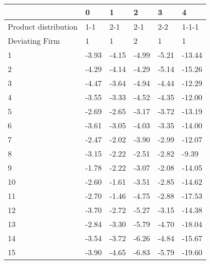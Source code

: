 \begin{tabular}{llllll}
\toprule
 & 0 & 1 & 2 & 3 & 4 \\
\midrule
Product distribution & 1-1 & 2-1  & 2-1  & 2-2  & 1-1-1 \\
Deviating Firm & 1 & 1 & 2 & 1 & 1 \\
1 & -3.93 & -4.15 & -4.99 & -5.21 & -13.44 \\
2 & -4.29 & -4.14 & -4.29 & -5.14 & -15.26 \\
3 & -4.47 & -3.64 & -4.94 & -4.44 & -12.29 \\
4 & -3.55 & -3.33 & -4.52 & -4.35 & -12.00 \\
5 & -2.69 & -2.65 & -3.17 & -3.72 & -13.19 \\
6 & -3.61 & -3.05 & -4.03 & -3.35 & -14.00 \\
7 & -2.47 & -2.02 & -3.90 & -2.99 & -12.07 \\
8 & -3.15 & -2.22 & -2.51 & -2.82 & -9.39 \\
9 & -1.78 & -2.22 & -3.07 & -2.08 & -14.05 \\
10 & -2.60 & -1.61 & -3.51 & -2.85 & -14.62 \\
11 & -2.70 & -1.46 & -4.75 & -2.88 & -17.53 \\
12 & -3.70 & -2.72 & -5.27 & -3.15 & -14.38 \\
13 & -2.84 & -3.30 & -5.79 & -4.70 & -18.04 \\
14 & -3.54 & -3.72 & -6.26 & -4.84 & -15.67 \\
15 & -3.90 & -4.65 & -6.83 & -5.79 & -19.60 \\
\bottomrule
\end{tabular}
